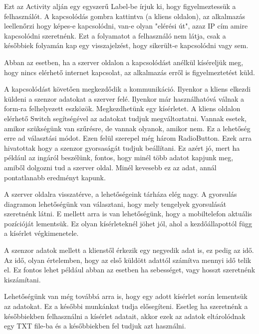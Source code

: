 \documentclass{thesis-ekf}
\theoremstyle{definition}
\theoremstyle{remark}
\begin{document}
Ezt az Activity alján egy egyszerű Label-be írjuk ki, hogy figyelmeztessük a felhasználót. A kapcsolódás gombra kattintva (a kliens oldalon), az alkalmazás leellenőrzi hogy képes-e kapcsolódni, van-e olyan "elérési út", azaz IP cím amire kapcsolódni szeretnénk. Ezt a folyamatot a felhasználó nem látja, csak a későbbiek folyamán kap egy visszajelzést, hogy sikerült-e kapcsolódni vagy sem.
\par Abban az esetben, ha a szerver oldalon a kapcsolódást anélkül kíséreljük meg, hogy nincs elérhető internet kapcsolat, az alkalmazás erről is figyelmeztetést küld.
\par A kapcsolódást követően megkezdődik a kommunikáció. Ilyenkor a kliens elkezdi küldeni a szenzor adatokat a szerver felé. Ilyenkor már használhatóvá válnak a form-ra felhelyezett eszközök. Megkezdhetünk egy kísérletet. A kliens oldalon elérhető Switch segítségével az adatokat tudjuk megváltoztatni. Vannak esetek, amikor szükségünk van szűrésre, de vannak olyanok, amikor nem. Ez a lehetőség erre ad választási módot. Ezen felül szerepel még három RadioButton. Ezek arra hivatottak hogy a szenzor gyorsaságát tudjuk beállítani. Ez azért jó, mert ha például az ingáról beszélünk, fontos, hogy minél több adatot kapjunk meg, amiből dolgozni tud a szerver oldal. Minél kevesebb ez az adat, annál pontatlanabb eredményt kapunk.
\par A szerver oldalra visszatérve, a lehetőségeink tárháza elég nagy. A gyorsulás diagramon lehetőségünk van választani, hogy mely tengelyek gyorsulását szeretnénk látni. E mellett arra is van lehetőségünk, hogy a mobiltelefon aktuális pozícióját lementsük. Ez olyan kísérleteknél jöhet jól, ahol a kezdőállapottól függ a kísérlet végkimenetele.
\par A szenzor adatok mellett a klienstől érkezik egy negyedik adat is, ez pedig az idő. Az idő, olyan értelemben, hogy az első küldött adattól számítva mennyi idő telik el. Ez fontos lehet például abban az esetben ha sebességet, vagy hosszt szeretnénk kiszámítani.
\par Lehetőségünk van még továbbá arra is, hogy egy adott kísérlet során lementsük az adatokat. Ez a későbbi munkánkat tudja elősegíteni. Esetleg ha szeretnénk a későbbiekben felhasználni a kísérlet adatait, akkor ezek az adatok eltárolódnak egy TXT file-ba és a későbbiekben fel tudjuk azt használni.
\end{document}
